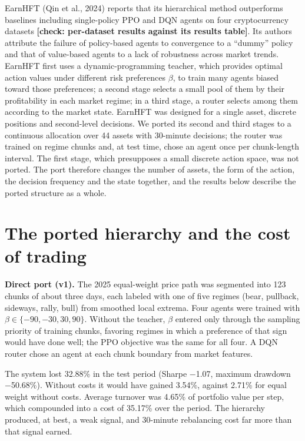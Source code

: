 \documentclass[12pt,a4paper]{report}
\begin{document}
EarnHFT (Qin et al., 2024) reports that its hierarchical method
outperforms baselines including single-policy PPO and DQN agents on four
cryptocurrency datasets \textbf{{[}check: per-dataset results against
its results table{]}}. Its authors attribute the failure of policy-based
agents to convergence to a ``dummy'' policy and that of value-based
agents to a lack of robustness across market trends. EarnHFT first uses
a dynamic-programming teacher, which provides optimal action values
under different risk preferences \(\beta\), to train many agents biased
toward those preferences; a second stage selects a small pool of them by
their profitability in each market regime; in a third stage, a router
selects among them according to the market state. EarnHFT was designed
for a single asset, discrete positions and second-level decisions. We
ported its second and third stages to a continuous allocation over 44
assets with 30-minute decisions; the router was trained on regime chunks
and, at test time, chose an agent once per chunk-length interval. The
first stage, which presupposes a small discrete action space, was not
ported. The port therefore changes the number of assets, the form of the
action, the decision frequency and the state together, and the results
below describe the ported structure as a whole.

\section{The ported hierarchy and the cost of
trading}\label{the-ported-hierarchy-and-the-cost-of-trading}

\textbf{Direct port (v1).} The 2025 equal-weight price path was
segmented into 123 chunks of about three days, each labeled with one of
five regimes (bear, pullback, sideways, rally, bull) from smoothed local
extrema. Four agents were trained with \(\beta\in\{-90,-30,30,90\}\).
Without the teacher, \(\beta\) entered only through the sampling
priority of training chunks, favoring regimes in which a preference of
that sign would have done well; the PPO objective was the same for all
four. A DQN router chose an agent at each chunk boundary from market
features.

The system lost 32.88\% in the test period (Sharpe −1.07, maximum
drawdown −50.68\%). Without costs it would have gained 3.54\%, against
2.71\% for equal weight without costs. Average turnover was 4.65\% of
portfolio value per step, which compounded into a cost of 35.17\% over
the period. The hierarchy produced, at best, a weak signal, and
30-minute rebalancing cost far more than that signal earned.
\end{document}
